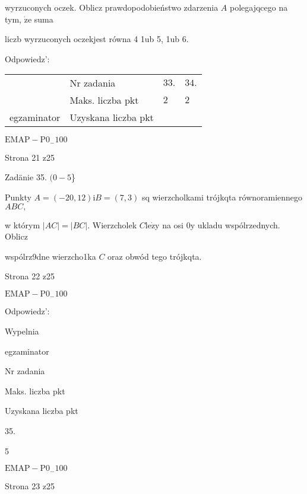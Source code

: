 \documentclass[a4paper,12pt]{article}
\begin{document}
wyrzuconych oczek. Oblicz prawdopodobieństwo zdarzenia $A$ polegajqcego na tym, $\dot{\mathrm{z}}\mathrm{e}$ suma

liczb wyrzuconych oczekjest równa 4 1ub 5, 1ub 6.

Odpowiedz':
\begin{center}
\begin{tabular}{|l|l|l|l|}
\cline{2-4}
&	\multicolumn{1}{|l|}{Nr zadania}&	\multicolumn{1}{|l|}{$33.$}&	\multicolumn{1}{|l|}{ $34.$}	\\
\cline{2-4}
&	\multicolumn{1}{|l|}{Maks. liczba pkt}&	\multicolumn{1}{|l|}{$2$}&	\multicolumn{1}{|l|}{ $2$}	\\
\cline{2-4}
\multicolumn{1}{|l|}{egzaminator}&	\multicolumn{1}{|l|}{Uzyskana liczba pkt}&	\multicolumn{1}{|l|}{}&	\multicolumn{1}{|l|}{}	\\
\hline
\end{tabular}

\end{center}
$\mathrm{E}\mathrm{M}\mathrm{A}\mathrm{P}-\mathrm{P}0_{-}100$

Strona 21 z25





Zadänie 35. $(0-5$\}

Punkty $A=(-20,12) \mathrm{i} B=(7,3)$ sq wierzcholkami trójkqta równoramiennego $ABC,$

w którym $|AC|=|BC|$. Wierzcholek $C \mathrm{l}\mathrm{e}\dot{\mathrm{z}}\mathrm{y}$ na osi $0\mathrm{y}$ ukladu wspólrzednych. Oblicz

wspólrz9dne wierzcho1ka $C$ oraz obwód tego trójkqta.

Strona 22 z25

$\mathrm{E}\mathrm{M}\mathrm{A}\mathrm{P}-\mathrm{P}0_{-}100$





Odpowiedz':

Wypelnia

egzaminator

Nr zadania

Maks. liczba pkt

Uzyskana liczba pkt

35.

5

$\mathrm{E}\mathrm{M}\mathrm{A}\mathrm{P}-\mathrm{P}0_{-}100$

Strona 23 z25
\end{document}
